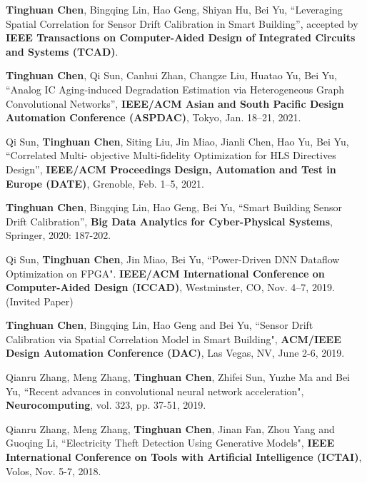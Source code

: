 \begin{cventries}


\begin{cvitems}

\footnotesize{

\item {\textbf{Tinghuan Chen}, Bingqing Lin, Hao Geng, Shiyan Hu, Bei Yu, ``Leveraging Spatial Correlation for Sensor Drift Calibration in Smart Building'', accepted by \textbf{IEEE Transactions on Computer-Aided Design of Integrated Circuits and Systems (TCAD)}.}

\item {\textbf{Tinghuan Chen}, Qi Sun, Canhui Zhan, Changze Liu, Huatao Yu, Bei Yu, ``Analog IC Aging-induced Degradation Estimation via Heterogeneous Graph Convolutional Networks'', \textbf{IEEE/ACM Asian and South Pacific Design Automation Conference (ASPDAC)}, Tokyo, Jan. 18–21, 2021.}

\item  {Qi Sun, \textbf{Tinghuan Chen}, Siting Liu, Jin Miao, Jianli Chen, Hao Yu, Bei Yu, ``Correlated Multi- objective Multi-fidelity Optimization for HLS Directives Design'', \textbf{IEEE/ACM Proceedings Design, Automation and Test in Europe (DATE)}, Grenoble, Feb. 1–5, 2021.}

\item {\textbf{Tinghuan Chen}, Bingqing Lin, Hao Geng, Bei Yu, ``Smart Building Sensor Drift Calibration'', \textbf{Big Data Analytics for Cyber-Physical Systems}, Springer, 2020: 187-202.}


\item {Qi Sun, \textbf{Tinghuan Chen}, Jin Miao, Bei Yu, ``Power-Driven DNN Dataflow Optimization on FPGA". \textbf{IEEE/ACM International Conference on Computer-Aided Design (ICCAD)}, Westminster, CO, Nov. 4–7, 2019. (Invited Paper)}

\item {\textbf{Tinghuan Chen}, Bingqing Lin, Hao Geng and Bei Yu, ``Sensor Drift Calibration via Spatial Correlation Model in Smart Building", \textbf{ACM/IEEE Design Automation Conference (DAC)}, Las Vegas, NV, June 2-6, 2019.}

\item {Qianru Zhang, Meng Zhang, \textbf{Tinghuan Chen}, Zhifei Sun, Yuzhe Ma and Bei Yu, ``Recent advances in convolutional neural network acceleration", \textbf{Neurocomputing}, vol. 323, pp. 37-51, 2019.}

\item {Qianru Zhang, Meng Zhang, \textbf{Tinghuan Chen}, Jinan Fan, Zhou Yang and Guoqing Li, ``Electricity Theft Detection Using Generative Models", \textbf{IEEE International Conference on Tools with Artificial Intelligence (ICTAI)}, Volos, Nov. 5-7, 2018.}

}
\end{cvitems}
\end{cventries}
